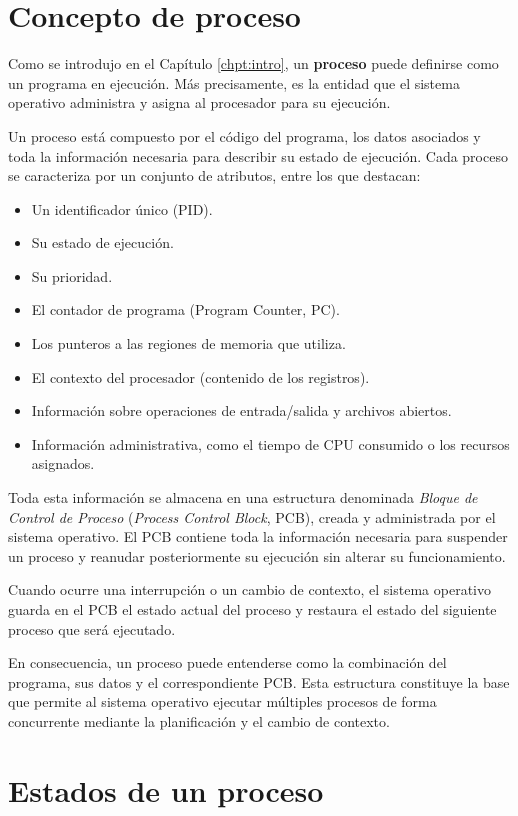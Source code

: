 \section{Concepto de proceso}

Como se introdujo en el Capítulo \ref{chpt:intro}, un \textbf{proceso} puede definirse como un programa en ejecución. Más precisamente, es la entidad que el sistema operativo administra y asigna al procesador para su ejecución. 

Un proceso está compuesto por el código del programa, los datos asociados y toda la información necesaria para describir su estado de ejecución. Cada proceso se caracteriza por un conjunto de atributos, entre los que destacan:
\begin{itemize}
  \item Un identificador único (PID).
  \item Su estado de ejecución.
  \item Su prioridad.
  \item El contador de programa (Program Counter, PC).
  \item Los punteros a las regiones de memoria que utiliza.
  \item El contexto del procesador (contenido de los registros).
  \item Información sobre operaciones de entrada/salida y archivos abiertos.
  \item Información administrativa, como el tiempo de CPU consumido o los recursos asignados.
\end{itemize}

Toda esta información se almacena en una estructura denominada \textit{Bloque de Control de Proceso} (\emph{Process Control Block}, PCB), creada y administrada por el sistema operativo. El PCB contiene toda la información necesaria para suspender un proceso y reanudar posteriormente su ejecución sin alterar su funcionamiento. 

Cuando ocurre una interrupción o un cambio de contexto, el sistema operativo guarda en el PCB el estado actual del proceso y restaura el estado del siguiente proceso que será ejecutado.

En consecuencia, un proceso puede entenderse como la combinación del programa, sus datos y el correspondiente PCB. Esta estructura constituye la base que permite al sistema operativo ejecutar múltiples procesos de forma concurrente mediante la planificación y el cambio de contexto.

\section{Estados de un proceso}

